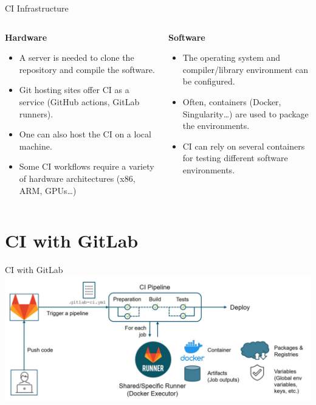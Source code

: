\documentclass{setbeamer}
\begin{document}
\begin{frame}[c]{CI Infrastructure}
    \begin{columns}[T]
        \begin{column}{0.5\textwidth}
            \textbf{Hardware}\\
            \begin{itemize}
            \item 
            A server is needed to clone the repository and compile the software.
            \item
            Git hosting sites offer CI as a service (GitHub actions, GitLab runners).
            \item 
            One can also host the CI on a local machine.
            \item 
            Some CI workflows require a variety of hardware architectures (x86, ARM, GPUs\dots)
            \end{itemize}
        \end{column}

        \begin{column}{0.5\textwidth}
            \textbf{Software}\\
            \begin{itemize}
            \item 
            The operating system and compiler/library environment can be configured.
            \item
            Often, containers (Docker, Singularity\dots) are used to package the environments.
            \item 
            CI can rely on several containers for testing different software environments.
            \end{itemize}
        \end{column}
    \end{columns}
\end{frame}

\section{CI with GitLab}

\begin{frame}[c]{CI with GitLab}
	\centering
    \includegraphics[width=15cm]{resources/ci-gitlab.JPG}
\end{frame}
\end{document}
